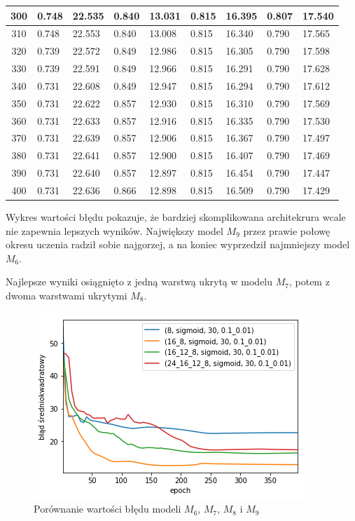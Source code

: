 \begin{longtable}{|c|l|l|l|l|l|l|l|l|}
        300 & 0.748 & 22.535 & 0.840 & 13.031 & 0.815 & 16.395 & 0.807 & 17.540 \\ \hline
        310 & 0.748 & 22.553 & 0.840 & 13.008 & 0.815 & 16.340 & 0.790 & 17.565 \\ \hline
        320 & 0.739 & 22.572 & 0.849 & 12.986 & 0.815 & 16.305 & 0.790 & 17.598 \\ \hline
        330 & 0.739 & 22.591 & 0.849 & 12.966 & 0.815 & 16.291 & 0.790 & 17.628 \\ \hline
        340 & 0.731 & 22.608 & 0.849 & 12.947 & 0.815 & 16.294 & 0.790 & 17.612 \\ \hline
        350 & 0.731 & 22.622 & 0.857 & 12.930 & 0.815 & 16.310 & 0.790 & 17.569 \\ \hline
        360 & 0.731 & 22.633 & 0.857 & 12.916 & 0.815 & 16.335 & 0.790 & 17.530 \\ \hline
        370 & 0.731 & 22.639 & 0.857 & 12.906 & 0.815 & 16.367 & 0.790 & 17.497 \\ \hline
        380 & 0.731 & 22.641 & 0.857 & 12.900 & 0.815 & 16.407 & 0.790 & 17.469 \\ \hline
        390 & 0.731 & 22.640 & 0.857 & 12.897 & 0.815 & 16.454 & 0.790 & 17.447 \\ \hline
        400 & 0.731 & 22.636 & 0.866 & 12.898 & 0.815 & 16.509 & 0.790 & 17.429 \\ \hline
    \end{longtable}

    Wykres wartości błędu pokazuje, że bardziej skomplikowana architekrura wcale nie zapewnia lepszych wyników.
    Największy model $M_9$ przez prawie połowę okresu uczenia radził sobie najgorzej, a na koniec wyprzedził najmniejszy model $M_6$.

    Najlepsze wyniki osiągnięto z jedną warstwą ukrytą w modelu $M_7$, potem z dwoma warstwami ukrytymi $M_8$.

    \begin{figure}[htp]
        \centering
        \includegraphics[scale=0.8]{./img/arch-error.png}
        \caption{Porównanie wartości błędu modeli $M_6$, $M_7$, $M_8$ i $M_9$}
    \end{figure}

